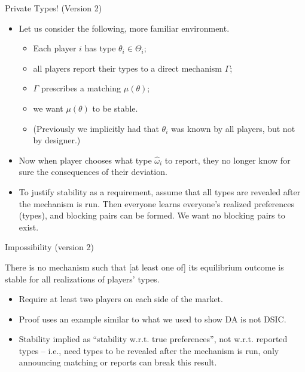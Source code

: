 \documentclass[english,10pt
,aspectratio=169
]{beamer}
\begin{document}
\begin{frame}{Private Types! (Version 2)}
\begin{itemize}
	\item Let us consider the following, more familiar environment.
	\begin{itemize}
		\item Each player $i$ has  type $\theta_i \in \Theta_i$;
		\item all players report their types to a direct mechanism $\Gamma$;
		\item $\Gamma$ prescribes a matching $\mu(\theta)$;
		\item we want $\mu(\theta)$ to be stable.
		\item (Previously we implicitly had that $\theta_i$ was known by all players, but not by designer.)
	\end{itemize}
	\item Now when player chooses what type $\hat{\omega}_i$ to report, they no longer know for sure the consequences of their deviation.
	\item To justify stability as a requirement, assume that all types are revealed after the mechanism is run. Then everyone learns everyone's realized preferences (types), and blocking pairs can be formed. We want no blocking pairs to exist.
\end{itemize}
\end{frame}


\begin{frame}{Impossibility (version 2)}
\begin{theorem}[Roth]
	There is no mechanism such that [at least one of] its equilibrium outcome is stable for all realizations of players' types.
\end{theorem}
\begin{itemize}
	\item Require at least two players on each side of the market.
	\item Proof uses an example similar to what we used to show DA is not DSIC.
	\item Stability implied as ``stability w.r.t. true preferences'', not w.r.t. reported types -- i.e., need types to be revealed after the mechanism is run, only announcing matching or reports can break this result.
\end{itemize}
\end{frame}
\end{document}
